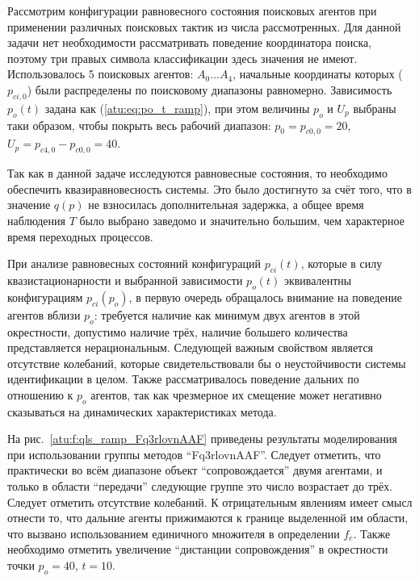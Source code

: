 Рассмотрим конфигурации равновесного состояния поисковых агентов
при применении различных поисковых тактик из числа рассмотренных.
Для данной задачи нет необходимости рассматривать поведение
координатора поиска, поэтому три правых символа классификации
здесь значения не имеют.
Использовалось 5 поисковых агентов: $A_0 \ldots A_4$,
начальные координаты которых ($p_{ci,0}$)
были распределены по поисковому диапазоны равномерно.
Зависимость $p_o(t)$
задана как (\ref{atu:eq:po_t_ramp}), при этом величины $p_o$ и $U_p$
выбраны таки образом, чтобы покрыть весь рабочий диапазон:
$p_0 = p_{c0,0} = 20$, $ U_p = p_{c4,0} - p_{c0,0} = 40$.

Так как в данной задаче исследуются равновесные состояния, то
необходимо обеспечить квазиравновесность системы.
Это было достигнуто за счёт того, что
в значение $q(p)$ не взносилась дополнительная задержка,
а общее время наблюдения $T$ было выбрано заведомо и значительно большим,
чем характерное время переходных процессов.

При анализе равновесных состояний конфигураций $p_{ci}(t)$,
которые в силу квазистационарности и выбранной зависимости $p_o(t)$
эквивалентны конфигурациям $p_{ci}(p_o)$,
в первую очередь обращалось внимание на поведение агентов
вблизи $p_o$: требуется наличие как минимум двух агентов в этой окрестности,
допустимо наличие трёх, наличие большего количества представляется нерациональным.
Следующей важным свойством является отсутствие колебаний,
которые свидетельствовали бы о неустойчивости системы идентификации в целом.
Также рассматривалось поведение дальних по отношению к $p_o$
агентов, так как чрезмерное их смещение может негативно
сказываться на динамических характеристиках метода.

На рис.~\ref{atu:f:qls_ramp_Fq3rlovnAAF} приведены результаты моделирования
при использовании группы методов ``Fq3rlovnAAF''.
Следует отметить, что практически во всём диапазоне
объект ``сопровождается'' двумя агентами, и только в области
``передачи'' следующие группе это число возрастает до трёх.
Следует отметить отсутствие колебаний. К отрицательным
явлениям имеет смысл отнести то, что дальние агенты
прижимаются к границе выделенной им области, что вызвано
использованием единичного множителя в определении $f_e$. Также необходимо отметить
увеличение ``дистанции сопровождения'' в окрестности точки $p_o=40$, $t=10$.

